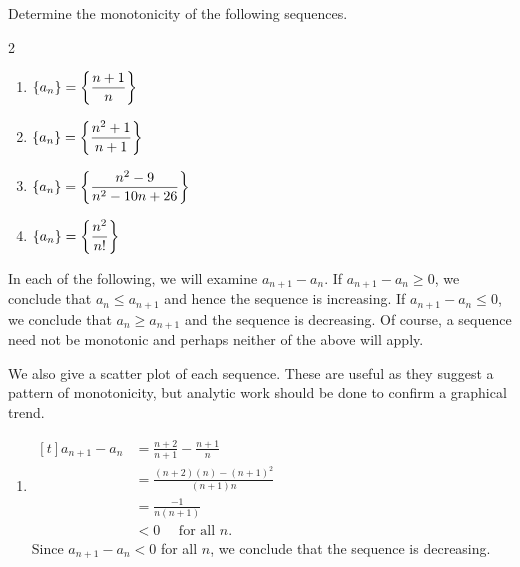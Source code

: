 
\begin{example}\label{ex_seq7}%
Determine the monotonicity of the following sequences.
\begin{multicols}{2}
\begin{enumerate}
\item $\displaystyle \{a_n\} = \left\{\frac{n+1}n\right\}$
\item	$\displaystyle \{a_n\} = \left\{\frac{n^2+1}{n+1}\right\}$	
\item $\displaystyle \{a_n\} = \left\{\frac{n^2-9}{n^2-10n+26}\right\}$
\item	$\displaystyle \{a_n\} = \left\{\frac{n^2}{n!}\right\}$	
\end{enumerate}
\end{multicols}
\solution
In each of the following, we will examine $a_{n+1}-a_n$. If $a_{n+1}-a_n \ge0$, we conclude that $a_n\le a_{n+1}$ and hence the sequence is increasing. If $a_{n+1}-a_n\le0$, we conclude that $a_n\ge a_{n+1}$ and the sequence is decreasing. Of course, a sequence need not be monotonic and perhaps neither of the above will apply.

We also give a scatter plot of each sequence. These are useful as they suggest a pattern of monotonicity, but analytic work should be done to confirm a graphical trend.

\begin{enumerate}
\item \hfill$\begin{aligned}[t]
a_{n+1}-a_n &= \frac{n+2}{n+1} - \frac{n+1}{n} \\		
	&= \frac{(n+2)(n)-(n+1)^2}{(n+1)n} \\
	&=	\frac{-1}{n(n+1)} \\
	&<0 \quad\text{ for all $n$.}
\end{aligned}$\hfill\null\\
%
%
Since $a_{n+1}-a_n<0$ for all $n$, we conclude that the sequence is decreasing.


\end{enumerate}
\end{example}
